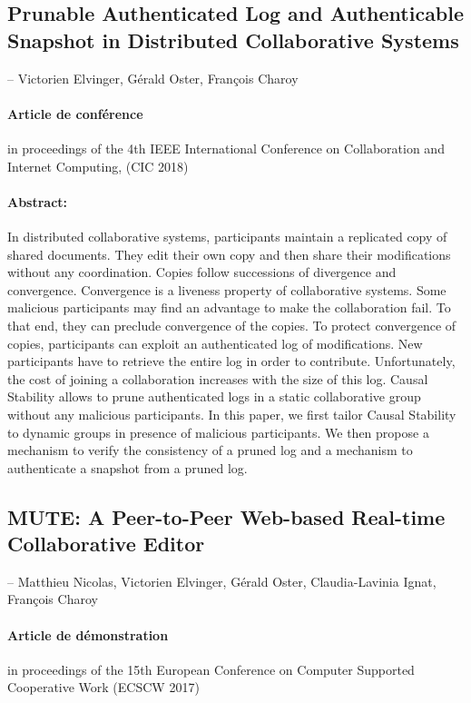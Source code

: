\subsection*{Prunable Authenticated Log and Authenticable Snapshot in Distributed Collaborative Systems \autocite{2018_elvinger_prunable-auth-log}}

-- Victorien Elvinger, Gérald Oster, François Charoy

\paragraph{Article de conférence} in proceedings of the 4th {IEEE} International Conference on Collaboration and Internet Computing, ({CIC} 2018)

\paragraph{Abstract:} In distributed collaborative systems, participants maintain a replicated copy of shared documents.
They edit their own copy and then share their modifications without any coordination.
Copies follow successions of divergence and convergence.
Convergence is a liveness property of collaborative systems.
Some malicious participants may find an advantage to make the collaboration fail. 
To that end, they can preclude convergence of the copies.
%
To protect convergence of copies, participants can exploit an authenticated log of modifications.
New participants have to retrieve the entire log in order to contribute. Unfortunately, the cost of joining a collaboration increases with the size of this log.
Causal Stability allows to prune authenticated logs in a static collaborative group without any malicious participants.
%
In this paper, we first tailor Causal Stability to dynamic groups in presence of malicious participants.
We then propose a mechanism to verify the consistency of a pruned log and a mechanism to authenticate a snapshot from a pruned log.

\bigskip
\bigskip

\subsection*{MUTE\@: A Peer-to-Peer Web-based Real-time Collaborative Editor \autocite{2017_nicolas-mute-demo}}

-- Matthieu Nicolas, Victorien Elvinger, Gérald Oster, Claudia-Lavinia Ignat,
François Charoy

\paragraph{Article de démonstration} in proceedings of the 15th European Conference on Computer Supported Cooperative Work ({ECSCW} 2017)

